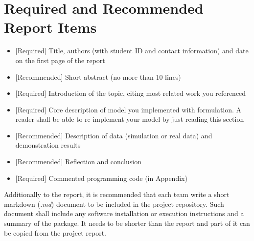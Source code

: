\documentclass[a4paper,11pt]{article} %
\begin{document}
\vspace{0.5cm}
\section{\textbf{Required and Recommended Report Items}}
\begin{itemize}
	\item {[Required] Title, authors (with student ID and contact information) and date on the first page of the report}
	\item {[Recommended] Short abstract (no more than 10 lines) }
	\item {[Required] Introduction of the topic, citing most related work you referenced}
	\item {[Required] Core description of model you implemented with formulation. A reader shall be able to re-implement your model by just reading this section}
	\item {[Recommended] Description of data (simulation or real data) and demonstration results}
	\item {[Recommended] Reflection and conclusion}
	\item {[Required] Commented programming code (in Appendix) }
\end{itemize}

Additionally to the report, it is recommended that each team write a short markdown (\textsl{.md}) document to be included in the project repository. Such document shall include any software installation or execution instructions and a summary of the package. It needs to be shorter than the report and part of it can be copied from the project report.



\bigskip



\end{document}
